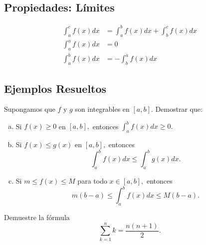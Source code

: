 	\subsection{Propiedades: Límites}
	\begin{align}
		\label{ayr:23.7}
		\int_{a}^{c}f(x)dx&=\int_{a}^{b}f(x)dx
		+\int_{b}^{c}f(x)dx\\		
		\label{ayr:23.7.i}
		\int_{a}^{a}f(x)dx&=0\\		
		\label{ayr:23.7.ii}
		\int_{a}^{b}f(x)dx&=-\int_{b}^{a}f(x)dx
	\end{align}
	


\subsection{Ejemplos Resueltos}


	\begin{problema}
		Supongamos que $f$ y $g$ son integrables en $[a,b].$ Demostrar que:
		\begin{enumerate}[(a)]
			\item Si $f(x)\geq 0$ en $[a,b],$ entonces $\int_{a}^{b}f(x)dx\geq 0.$
			\item Si $f(x) \leq g(x)$ en $[a,b],$ entonces
			$$
			\int_{a}^{b}f(x)dx \leq \int_{a}^{b}g(x)dx.
			$$
			\item Si $m\leq f(x) \leq M$ para todo $x\in [a,b],$ entonces
			$$
			m\left( b-a \right) \leq \int_{a}^{b}f(x)dx
			\leq M\left( b-a \right).
			$$
		\end{enumerate}
	\end{problema}



	



	\begin{problema}
		\label{ayr:solved:23.5}
		Demuestre la fórmula
		$$
		\sum_{k=1}^{n}k=\dfrac{n\left( n+1 \right)}{2}.
		$$
	\end{problema}
	
